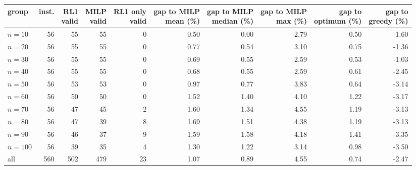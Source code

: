 \begin{tabular}{@{}lrrrrrrrrr@{}}
\toprule
group & inst. & \shortstack[r]{RL1\\valid} & \shortstack[r]{MILP\\valid} & \shortstack[r]{RL1 only\\valid} & \shortstack[r]{gap to MILP\\mean (\%)} & \shortstack[r]{gap to MILP\\median (\%)} & \shortstack[r]{gap to MILP\\max (\%)} & \shortstack[r]{gap to\\optimum (\%)} & \shortstack[r]{gap to\\greedy (\%)} \\
\midrule
$n=10$ & 56 & 55 & 55 & 0 & 0.50 & 0.00 & 2.79 & 0.50 & -1.60 \\
$n=20$ & 56 & 55 & 55 & 0 & 0.77 & 0.54 & 3.10 & 0.75 & -1.36 \\
$n=30$ & 56 & 55 & 55 & 0 & 0.69 & 0.55 & 2.59 & 0.53 & -1.03 \\
$n=40$ & 56 & 55 & 55 & 0 & 0.68 & 0.55 & 2.59 & 0.61 & -2.45 \\
$n=50$ & 56 & 53 & 53 & 0 & 0.97 & 0.77 & 3.83 & 0.64 & -3.14 \\
$n=60$ & 56 & 50 & 50 & 0 & 1.52 & 1.40 & 4.10 & 1.22 & -3.17 \\
$n=70$ & 56 & 47 & 45 & 2 & 1.60 & 1.34 & 4.55 & 1.19 & -3.13 \\
$n=80$ & 56 & 47 & 39 & 8 & 1.69 & 1.51 & 4.38 & 1.19 & -3.13 \\
$n=90$ & 56 & 46 & 37 & 9 & 1.59 & 1.58 & 4.18 & 1.41 & -3.35 \\
$n=100$ & 56 & 39 & 35 & 4 & 1.30 & 1.22 & 3.14 & 0.98 & -3.50 \\
\midrule
all & 560 & 502 & 479 & 23 & 1.07 & 0.89 & 4.55 & 0.74 & -2.47 \\
\bottomrule
\end{tabular}

